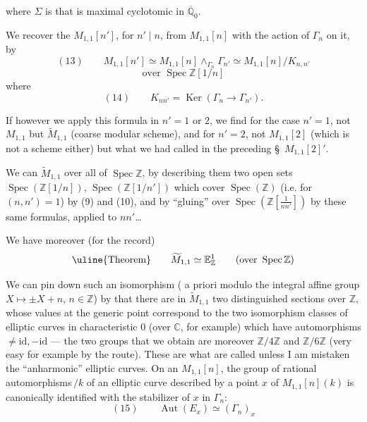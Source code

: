 
 where $\Sigma$  is  that is maximal cyclotomic in $\overline{\mathbb Q}_0$.

 We recover the $M_{1,1}[n']$, for $n'\mid n$,  from $M_{1,1}[n]$ with the action of $\Gamma_n$ on it, by
\[
(13)\qquad M_{1,1}[n']\simeq M_{1,1}[n]\wedge_{\Gamma_n}\Gamma_{n'}\simeq M_{1,1}[n]/K_{n,n'}
\]
\[
\text{over }\operatorname{Spec}\mathbb Z[1/n]
\]
where
\[
(14)\qquad K_{nn'}=\operatorname{Ker}(\Gamma_n\longrightarrow\Gamma_{n'}).
\]


If however we apply this formula in  $n'=1$ or $2$, we find for the case $n'=1$, not $M_{1,1}$ but $\widetilde M_{1,1}$ (coarse modular scheme), and for $n'=2$, not $M_{1,1}[2]$ (which is not a scheme either) but what we had called in the preceding \S\ $M_{1,1}[2]'$.

We can    $\widetilde M_{1,1}$ over all of $\operatorname{Spec}\mathbb Z$,  by describing them  two open sets $\operatorname{Spec}(\mathbb Z[1/n])$, $\operatorname{Spec}(\mathbb Z[1/n'])$ which cover $\operatorname{Spec}(\mathbb Z)$ (i.e. for $(n,n')=1$) by (9) and (10),  and by ``gluing''  over $\operatorname{Spec}(\mathbb Z[\frac{1}{nn'}])$ by these same formulas, applied to $nn'$\ldots


We have moreover (for the record)
\[
\text{\uline{Theorem}}\qquad \widetilde M_{1,1}\simeq\mathbb E^1_{\mathbb Z}\qquad(\text{over }\operatorname{Spec}\mathbb Z)
\]

We can pin down such an isomorphism ( a priori modulo the integral affine group $X\longmapsto\pm X+n$, $n\in\mathbb Z$) by  that there are in $\widetilde M_{1,1}$ two distinguished sections over $\mathbb Z$, whose values at the generic point correspond to the two isomorphism classes of elliptic curves in characteristic $0$ (over $\mathbb C$, for example) which have automorphisms $\ne\mathrm{id},-\mathrm{id}$ --- the two groups  that we obtain are moreover $\mathbb Z/4\mathbb Z$ and $\mathbb Z/6\mathbb Z$ (very easy for example by the  route). These are what are called unless I am mistaken the ``anharmonic'' elliptic curves. On an $M_{1,1}[n]$, the group of rational automorphisms\,$/k$ of an elliptic curve described by a point $x$ of $M_{1,1}[n](k)$ is canonically identified with the stabilizer of $x$ in $\Gamma_n$:
\[
(15)\qquad\operatorname{Aut}(E_x)\simeq(\Gamma_n)_x
\]

